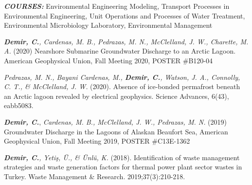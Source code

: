 \documentclass[10pt,a4paper]{altacv}
\begin{document}
\divider

\textbf{\textit{COURSES:}} Environmental Engineering Modeling, Transport Processes in Environmental Engineering, Unit Operations and Processes of Water Treatment, Environmental Microbiology Laboratory, Environmental Management


\hspace{1cm}\textbf{\textit{Demir, C.}}\textit{, Cardenas, M. B.,  Pedrazas, M. N.,  McClelland, J. W.,  Charette, M. A.} (2020) Nearshore Submarine Groundwater Discharge to an Arctic Lagoon. American Geophysical Union, Fall Meeting 2020, POSTER #B120-04

\hspace{1cm}\textit{Pedrazas, M. N., Bayani Cardenas, M., \textbf{Demir, C.}, Watson, J. A., Connolly, C. T., & McClelland, J. W.} (2020). Absence of ice-bonded permafrost beneath an Arctic lagoon revealed by electrical geophysics. Science Advances, 6(43), eabb5083.

\hspace{1cm}\textbf{\textit{Demir, C.}}, \textit{Cardenas, M. B.,  McClelland, J. W.,  Pedrazas, M. N.} (2019) Groundwater Discharge in the Lagoons of Alaskan Beaufort Sea, American Geophysical Union, Fall Meeting 2019, POSTER #C13E-1362

\hspace{1cm}\textbf{\textit{Demir, C.}}\textit{, Yetiş, Ü., & Ünlü, K.} (2018). Identification of waste management strategies and waste generation factors for thermal power plant sector wastes in Turkey. Waste Management &  Research. 2019;37(3):210-218. \newline




\clearpage



\end{document}

